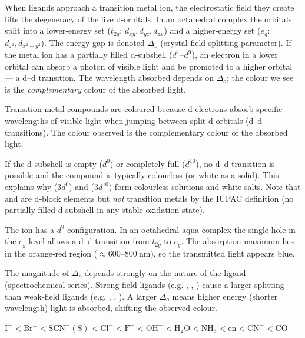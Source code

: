 \documentclass[11pt]{article}
\newcommand{\cle}[1]{{\popxbold\color{popdark}#1}}
\newcounter{popsec}
\newcounter{popsub}
\newcommand{\courssub}[1]{%
  \stepcounter{popsub}%
  \par\vspace{9pt}\noindent{\popxbold\fontsize{11.5}{13}\selectfont\color{popink}{\color{poporange}\thepopsec.\thepopsub}\hspace{6pt}#1}\par\nopagebreak\vspace{4pt}
}
\begin{document}
When ligands approach a transition metal ion, the electrostatic field they create lifts the degeneracy of the five d‑orbitals. In an octahedral complex the orbitals split into a lower‑energy set ($t_{2g}$: $d_{xy}, d_{yz}, d_{zx}$) and a higher‑energy set ($e_g$: $d_{z^2}, d_{x^2-y^2}$). The energy gap is denoted $\Delta_o$ (crystal field splitting parameter). If the metal ion has a partially filled d‑subshell ($d^1$–$d^9$), an electron in a lower orbital can absorb a photon of visible light and be promoted to a higher orbital — a \cle{d–d transition}. The wavelength absorbed depends on $\Delta_o$; the colour we see is the \emph{complementary} colour of the absorbed light.

\begin{propriete}
Transition metal compounds are coloured because d‑electrons absorb specific wavelengths of visible light when jumping between split d‑orbitals (d–d transitions). The colour observed is the complementary colour of the absorbed light.
\end{propriete}

If the d‑subshell is empty ($d^0$) or completely full ($d^{10}$), no d–d transition is possible and the compound is typically colourless (or white as a solid). This explains why  ($3d^0$) and  ($3d^{10}$) form colourless solutions and white salts. Note that  and  are d‑block elements but \emph{not} transition metals by the IUPAC definition (no partially filled d‑subshell in any stable oxidation state).

\begin{exemplebox}
The  ion has a $d^9$ configuration. In an octahedral aqua complex the single hole in the $e_g$ level allows a d–d transition from $t_{2g}$ to $e_g$. The absorption maximum lies in the orange‑red region ($\approx 600–800\ \mathrm{nm}$), so the transmitted light appears blue.
\end{exemplebox}

\courssub{Effect of Ligand on Colour}

The magnitude of $\Delta_o$ depends strongly on the nature of the ligand (spectrochemical series). Strong‑field ligands (e.g. , , ) cause a larger splitting than weak‑field ligands (e.g. , , ). A larger $\Delta_o$ means higher energy (shorter wavelength) light is absorbed, shifting the observed colour.

\begin{propriete}
\ensuremath{\mathrm{I^{-} < Br^{-} < SCN^{-} (S) < Cl^{-} < F^{-} < OH^{-} < H_{2}O < NH_{3} < en < CN^{-} < CO}}
\end{propriete}
\end{document}
